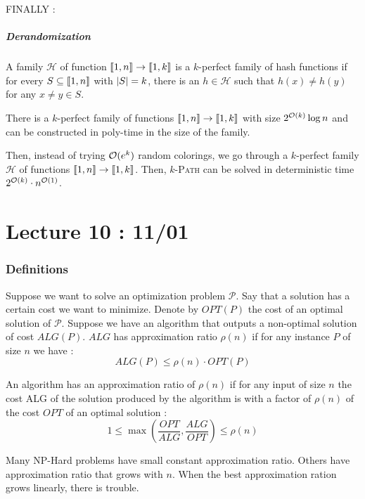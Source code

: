 \documentclass{cours}
\begin{document}
FINALLY : 
\subsubsection{Derandomization}
\begin{definition}
    A family $\mathcal{H}$ of function $\left\llbracket 1, n\right\rrbracket \rightarrow \left\llbracket 1, k\right\rrbracket$ is a $k$-perfect family of hash functions if for every $S \subseteq \left\llbracket 1, n\right\rrbracket$ with $\left|S\right| = k$, there is an $h \in \mathcal{H}$ such that $h(x) \neq h(y)$ for any $x\neq y \in S$.
\end{definition}

\begin{theorem}
    There is a $k$-perfect family of functions $\left\llbracket 1, n\right\rrbracket \rightarrow \left\llbracket 1, k\right\rrbracket$ with size $2^{\mathcal{O}(k)}\log n$ and can be constructed in poly-time in the size of the family. 
\end{theorem}

Then, instead of trying $\mathcal{O}(e^{k})$ random colorings, we go through a $k$-perfect family $\mathcal{H}$ of functions $\left\llbracket 1, n\right\rrbracket \rightarrow \left\llbracket 1, k\right\rrbracket$. Then, $k$-\textsc{Path} can be solved in deterministic time $2^{\mathcal{O}(k)}\cdot n^{\mathcal{O}(1)}$.


\part[Approximation Algorithm]{Lecture 10 : 11/01}
\section{Definitions}
Suppose we want to solve an optimization problem $\mathcal{P}$. Say that a solution has a certain cost we want to minimize. Denote by $OPT(P)$ the cost of an optimal solution of $\mathcal{P}$. Suppose we have an algorithm that outputs a non-optimal solution of cost $ALG(P)$. $ALG$ has approximation ratio $\rho(n)$ if for any instance $P$ of size $n$ we have : \[ ALG(P) \leq \rho(n)\cdot OPT(P)\] 

\begin{definition}
    An algorithm has an approximation ratio of $\rho(n)$ if for any input of size $n$ the cost ALG of the solution produced by the algorithm is with a factor of $\rho(n)$ of the cost $OPT$ of an optimal solution : 
    \[
        1 \leq \max \left(\frac{OPT}{ALG}, \frac{ALG}{OPT}\right) \leq \rho(n)
    \]
\end{definition}

Many NP-Hard problems  have small constant approximation ratio. Others have approximation ratio that grows with $n$. When the best approximation ration grows linearly, there is trouble. 
\end{document}
